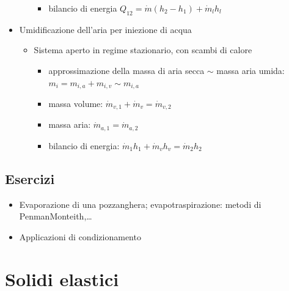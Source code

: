\documentclass[letterpaper,10pt,italian]{jupyterBook}
\begin{document}
\begin{itemize}
\begin{itemize}
\begin{itemize}
\item {} 
\sphinxAtStartPar
bilancio di energia \(Q_{12} = \dot{m}(h_2 - h_1) + \dot{m}_l h_l\)

\end{itemize}

\end{itemize}

\item {} 
\sphinxAtStartPar
Umidificazione dell’aria per iniezione di acqua
\begin{itemize}
\item {} 
\sphinxAtStartPar
Sistema aperto in regime stazionario, con scambi di calore
\begin{itemize}
\item {} 
\sphinxAtStartPar
approssimazione della massa di aria secca \(\sim\) massa aria umida: \(m_{i} = m_{i,a} + m_{i,v} \sim m_{i,a}\)

\item {} 
\sphinxAtStartPar
massa volume: \(\dot{m}_{v,1} + \dot{m}_v = \dot{m}_{v,2}\)

\item {} 
\sphinxAtStartPar
massa aria: \(\dot{m}_{a,1} = \dot{m}_{a,2}\)

\item {} 
\sphinxAtStartPar
bilancio di energia: \(\dot{m}_{1} h_1 + \dot{m}_v h_v = \dot{m}_2 h_2\)

\end{itemize}

\end{itemize}

\end{itemize}


\subsection{Esercizi}
\label{\detokenize{ch/thermodynamics/humid-air:esercizi}}\begin{itemize}
\item {} 
\sphinxAtStartPar
Evaporazione di una pozzanghera; evapo\sphinxhyphen{}traspirazione: metodi di Penman\sphinxhyphen{}Monteith,…

\item {} 
\sphinxAtStartPar
Applicazioni di condizionamento

\end{itemize}

\sphinxstepscope


\section{Solidi elastici}
\label{\detokenize{ch/thermodynamics/elastic-solid-1d:solidi-elastici}}\label{\detokenize{ch/thermodynamics/elastic-solid-1d:physics-hs-thermodynamics-matter-elastic-1d}}\label{\detokenize{ch/thermodynamics/elastic-solid-1d::doc}}
\end{document}
